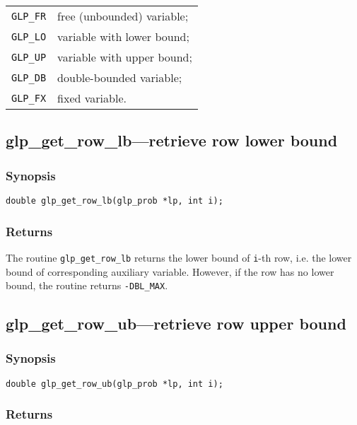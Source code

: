 \begin{tabular}{@{}ll}
\verb|GLP_FR| & free (unbounded) variable; \\
\verb|GLP_LO| & variable with lower bound; \\
\verb|GLP_UP| & variable with upper bound; \\
\verb|GLP_DB| & double-bounded variable; \\
\verb|GLP_FX| & fixed variable. \\
\end{tabular}

\subsection{glp\_get\_row\_lb---retrieve row lower bound}

\subsubsection*{Synopsis}

\begin{verbatim}
double glp_get_row_lb(glp_prob *lp, int i);
\end{verbatim}

\subsubsection*{Returns}

The routine \verb|glp_get_row_lb| returns the lower bound of
\verb|i|-th row, i.e. the lower bound of corresponding auxiliary
variable. However, if the row has no lower bound, the routine returns
\verb|-DBL_MAX|.

\subsection{glp\_get\_row\_ub---retrieve row upper bound}

\subsubsection*{Synopsis}

\begin{verbatim}
double glp_get_row_ub(glp_prob *lp, int i);
\end{verbatim}

\subsubsection*{Returns}

